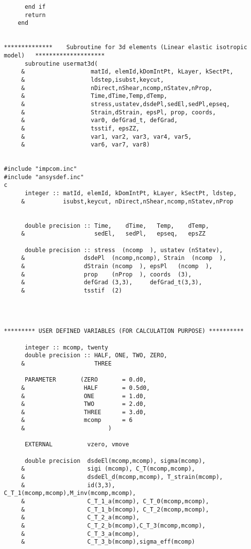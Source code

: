 \begin{lstlisting}
      end if
      return
	end
	
	
**************    Subroutine for 3d elements (Linear elastic isotropic model)   ********************
      subroutine usermat3d(
     &                   matId, elemId,kDomIntPt, kLayer, kSectPt,
     &                   ldstep,isubst,keycut,
     &                   nDirect,nShear,ncomp,nStatev,nProp,
     &                   Time,dTime,Temp,dTemp,
     &                   stress,ustatev,dsdePl,sedEl,sedPl,epseq,
     &                   Strain,dStrain, epsPl, prop, coords, 
     &                   var0, defGrad_t, defGrad,
     &                   tsstif, epsZZ,
     &                   var1, var2, var3, var4, var5,
     &                   var6, var7, var8)
	
	
#include "impcom.inc"
#include "ansysdef.inc"
c
      integer :: matId, elemId, kDomIntPt, kLayer, kSectPt, ldstep,
     &           isubst,keycut, nDirect,nShear,ncomp,nStatev,nProp


      double precision :: Time,    dTime,   Temp,    dTemp,
     &                    sedEl,   sedPl,   epseq,   epsZZ
                  
      double precision :: stress  (ncomp  ), ustatev (nStatev), 
     &                 dsdePl  (ncomp,ncomp), Strain  (ncomp  ), 
     &                 dStrain (ncomp  ), epsPl   (ncomp  ),
     &                 prop    (nProp  ), coords  (3), 
     &                 defGrad (3,3),     defGrad_t(3,3),  
     &                 tsstif  (2)
	

	
	
********* USER DEFINED VARIABLES (FOR CALCULATION PURPOSE) **********	
	
      integer :: mcomp, twenty
      double precision :: HALF, ONE, TWO, ZERO,
     &                    THREE
      
      PARAMETER       (ZERO       = 0.d0,
     &                 HALF       = 0.5d0,
     &                 ONE        = 1.d0,
     &                 TWO        = 2.d0,
     &                 THREE      = 3.d0,
     &                 mcomp      = 6
     &                        )
	
      EXTERNAL          vzero, vmove
   
      double precision  dsdeEl(mcomp,mcomp), sigma(mcomp),
     &                  sigi (mcomp), C_T(mcomp,mcomp),
     &                  dsdeEl_d(mcomp,mcomp), T_strain(mcomp),
     &                  id(3,3), C_T_1(mcomp,mcomp),M_inv(mcomp,mcomp),
     &                  C_T_1_a(mcomp), C_T_0(mcomp,mcomp),
     &                  C_T_1_b(mcomp), C_T_2(mcomp,mcomp), 
     &                  C_T_2_a(mcomp),
     &                  C_T_2_b(mcomp),C_T_3(mcomp,mcomp), 
     &                  C_T_3_a(mcomp),
     &                  C_T_3_b(mcomp),sigma_eff(mcomp)
                  


\end{lstlisting}
